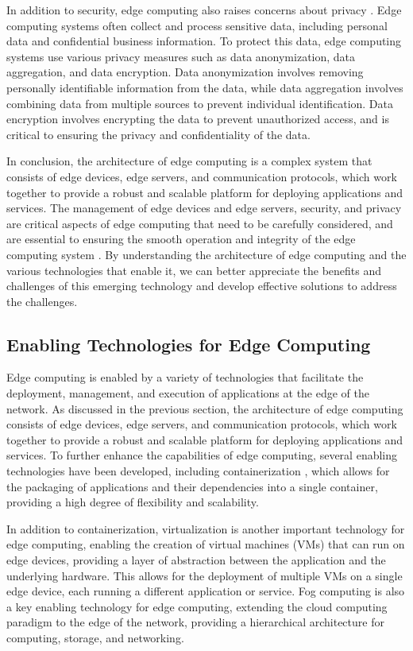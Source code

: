 \documentclass[11pt]{article}
\begin{document}
In addition to security, edge computing also raises concerns about privacy \cite{ref8}. Edge computing systems often collect and process sensitive data, including personal data and confidential business information. To protect this data, edge computing systems use various privacy measures such as data anonymization, data aggregation, and data encryption. Data anonymization involves removing personally identifiable information from the data, while data aggregation involves combining data from multiple sources to prevent individual identification. Data encryption involves encrypting the data to prevent unauthorized access, and is critical to ensuring the privacy and confidentiality of the data.

In conclusion, the architecture of edge computing is a complex system that consists of edge devices, edge servers, and communication protocols, which work together to provide a robust and scalable platform for deploying applications and services. The management of edge devices and edge servers, security, and privacy are critical aspects of edge computing that need to be carefully considered, and are essential to ensuring the smooth operation and integrity of the edge computing system \cite{ref28}. By understanding the architecture of edge computing and the various technologies that enable it, we can better appreciate the benefits and challenges of this emerging technology and develop effective solutions to address the challenges.

\subsection{Enabling Technologies for Edge Computing}

Edge computing is enabled by a variety of technologies that facilitate the deployment, management, and execution of applications at the edge of the network. As discussed in the previous section, the architecture of edge computing consists of edge devices, edge servers, and communication protocols, which work together to provide a robust and scalable platform for deploying applications and services. To further enhance the capabilities of edge computing, several enabling technologies have been developed, including containerization \cite{ref29}, which allows for the packaging of applications and their dependencies into a single container, providing a high degree of flexibility and scalability.

In addition to containerization, virtualization \cite{ref30} is another important technology for edge computing, enabling the creation of virtual machines (VMs) that can run on edge devices, providing a layer of abstraction between the application and the underlying hardware. This allows for the deployment of multiple VMs on a single edge device, each running a different application or service. Fog computing \cite{ref31} is also a key enabling technology for edge computing, extending the cloud computing paradigm to the edge of the network, providing a hierarchical architecture for computing, storage, and networking.
\end{document}
